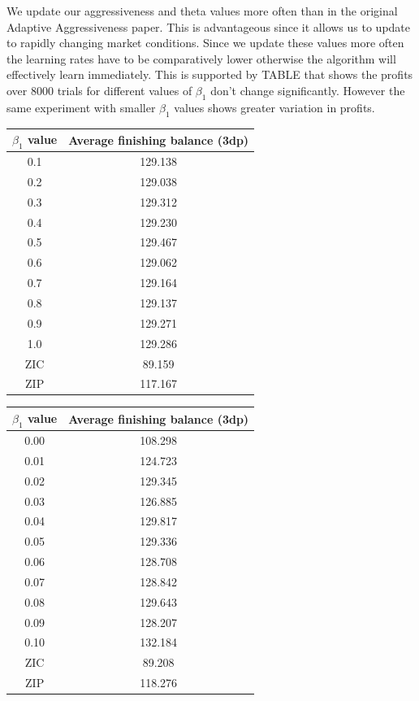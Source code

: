 \documentclass[preprint]{acm_proc_article-sp} %
\begin{document}
We update our aggressiveness and theta values more often than in the original Adaptive Aggressiveness 
paper\cite{AA_thesis}. This is advantageous since it allows us to update to rapidly changing market 
conditions. Since we update these values more often the learning rates have to be comparatively lower 
otherwise the algorithm will effectively learn immediately. This is supported by TABLE that shows 
the profits over 8000 trials for different values of $\beta_1$ don't change significantly. However 
the same experiment with smaller $\beta_1$ values shows greater variation in profits.

\begin{table}[h]
  \centering
  \label{tbl:beta1_results_big}
  \begin{tabular}{ | c | c | }
    \hline
    \textbf{$\beta_1$ value} & \textbf{Average finishing balance (3dp)} \\
    \hline
    0.1 & 129.138 \\
    0.2 & 129.038 \\
    0.3 & 129.312 \\
    0.4 & 129.230 \\
    0.5 & 129.467 \\
    0.6 & 129.062 \\
    0.7 & 129.164 \\
    0.8 & 129.137 \\
    0.9 & 129.271 \\
    1.0 & 129.286 \\
    \hline \hline
    ZIC & 89.159 \\
    ZIP & 117.167 \\
    \hline
  \end{tabular}
\end{table}

\begin{table}[h]
  \centering
  \label{tbl:beta1_results_small}
  \begin{tabular}{ | c | c | }
    \hline
    \textbf{$\beta_1$ value} & \textbf{Average finishing balance (3dp)} \\
    \hline
    0.00 & 108.298 \\
    0.01 & 124.723 \\
    0.02 & 129.345 \\
    0.03 & 126.885 \\
    0.04 & 129.817 \\
    0.05 & 129.336 \\
    0.06 & 128.708 \\
    0.07 & 128.842 \\
    0.08 & 129.643 \\
    0.09 & 128.207 \\
    0.10 & 132.184 \\
    \hline \hline
    ZIC & 89.208 \\
    ZIP & 118.276 \\
    \hline
  \end{tabular}
\end{table}
\end{document}
